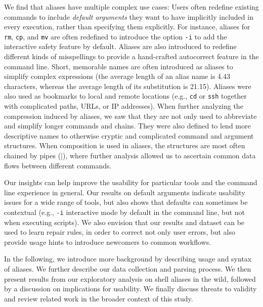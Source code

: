 We find that aliases have multiple complex use cases: \TODO
Users often redefine existing commands to include \emph{default arguments} they want to have implicitly included in every execution, rather than specifying them explicitly.
For instance, aliases for \verb|rm|, \verb|cp|, and \verb|mv| are often redefined to introduce the option \verb|-i| to add the interactive safety feature by default.
Aliases are also introduced to redefine different kinds of misspellings to provide a hand-crafted autocorrect feature in the command line. 
Short, memorable names are often introduced as aliases to simplify complex expressions (the average length of an alias name is 4.43 characters, whereas the average length of its substitution is 21.15).
Aliases were also used as bookmarks to local and remote locations (e.g., \verb|cd| or \verb|ssh| together with complicated paths, URLs, or IP addresses).
When further analyzing the compression induced by aliases, we saw that they are not only used to abbreviate and simplify longer commands and chains.
They were also defined to lend more descriptive names to otherwise cryptic and complicated command and argument structures.
When composition is used in aliases, the structures are most often chained by pipes (\verb|||), where further analysis allowed us to ascertain common data flows between different commands.

Our insights can help improve the usability for particular tools and the command line experience in general.
Our results on default arguments indicate usability issues for a wide range of tools, but also shows that defaults can sometimes be contextual (e.g., \verb|-i| interactive mode by default in the command line, but not when executing scripts).
We also envision that our results and dataset can be used to learn repair rules, in order to correct not only user errors, but also provide usage hints to introduce newcomers to common workflows.

In the following, we introduce more background by describing usage and syntax of aliases. We further describe our data collection and parsing process. We then present results from our exploratory analysis on shell aliases in the wild, followed by a discussion on implications for usability. We finally discuss threats to validity and review related work in the broader context of this study. 